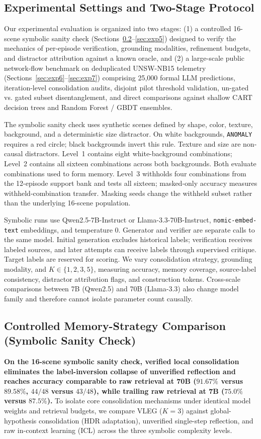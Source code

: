 \documentclass[10pt,a4paper,onecolumn]{article}
\theoremstyle{definition}
\theoremstyle{remark}
\begin{document}
\subsection{Experimental Settings and Two-Stage Protocol}
Our experimental evaluation is organized into two stages: (1) a controlled 16-scene symbolic sanity check (Sections~\ref{sec:exp1}--\ref{sec:exp5}) designed to verify the mechanics of per-episode verification, grounding modalities, refinement budgets, and distractor attribution against a known oracle, and (2) a large-scale public network-flow benchmark on deduplicated UNSW-NB15 telemetry (Sections~\ref{sec:exp6}--\ref{sec:exp7}) comprising 25,000 formal LLM predictions, iteration-level consolidation audits, disjoint pilot threshold validation, un-gated vs. gated subset disentanglement, and direct comparisons against shallow CART decision trees and Random Forest / GBDT ensembles.

The symbolic sanity check uses synthetic scenes defined by shape, color, texture, background, and a deterministic size distractor. On white backgrounds, \texttt{ANOMALY} requires a red circle; black backgrounds invert this rule. Texture and size are non-causal distractors. Level~1 contains eight white-background combinations; Level~2 contains all sixteen combinations across both backgrounds. Both evaluate combinations used to form memory. Level~3 withholds four combinations from the 12-episode support bank and tests all sixteen; masked-only accuracy measures withheld-combination transfer. Masking seeds change the withheld subset rather than the underlying 16-scene population.

Symbolic runs use Qwen2.5-7B-Instruct or Llama-3.3-70B-Instruct, \texttt{nomic-embed-text} embeddings, and temperature $0$. Generator and verifier are separate calls to the same model. Initial generation excludes historical labels; verification receives labeled sources, and later attempts can receive labels through supervised critique. Target labels are reserved for scoring. We vary consolidation strategy, grounding modality, and $K\in\{1,2,3,5\}$, measuring accuracy, memory coverage, source-label consistency, distractor attribution flags, and construction tokens. Cross-scale comparisons between 7B (Qwen2.5) and 70B (Llama-3.3) also change model family and therefore cannot isolate parameter count causally.

\subsection{Controlled Memory-Strategy Comparison (Symbolic Sanity Check)}
\label{sec:exp1}
\textbf{On the 16-scene symbolic sanity check, verified local consolidation eliminates the label-inversion collapse of unverified reflection and reaches accuracy comparable to raw retrieval at 70B ($91.67\%$ versus $89.58\%$, $44/48$ versus $43/48$), while trailing raw retrieval at 7B ($75.0\%$ versus $87.5\%$).} To isolate core consolidation mechanisms under identical model weights and retrieval budgets, we compare VLEG ($K=3$) against global-hypothesis consolidation (HDR adaptation), unverified single-step reflection, and raw in-context learning (ICL) across the three symbolic complexity levels.
\end{document}
